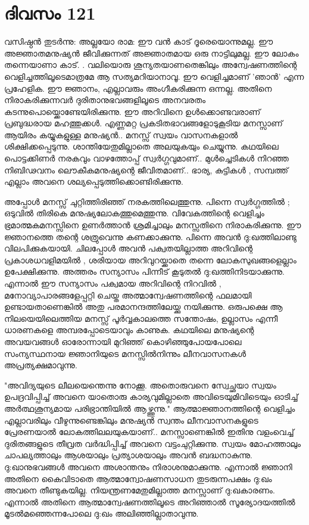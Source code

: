 \newpage
\section{ദിവസം 121}


വസിഷ്ഠന്‍ തുടര്‍ന്നു: അല്ലയോ രാമ: ഈ വന്‍ കാട്‌ ദൂരെയൊന്നുമല്ല. ഈ അജ്ഞാതമനുഷ്യന്‍ ജീവിക്കുന്നത്‌ അജ്ഞാതമായ ഒരു നാട്ടിലുമല്ല. ഈ ലോകം തന്നെയാണാ കാട്‌. . വലിയൊരു ശൂന്യതയാണതെങ്കിലും അന്വേഷണത്തിന്റെ വെളിച്ചത്തിലൂടെമാത്രമേ ആ സത്യമറിയാനാവൂ. ഈ വെളിച്ചമാണ്‌ 'ഞാന്‍' എന്ന പ്രഹേളിക. ഈ ജ്ഞാനം, എല്ലാവരും അംഗീകരിക്കുന്ന ഒന്നല്ല. അതിനെ നിരാകരിക്കുന്നവര്‍ ദുരിതാനുഭവങ്ങളിലൂടെ അനവരതം കടന്നുപൊയ്ക്കൊണ്ടേയിരിക്കുന്നു. ഈ അറിവിനെ ഉള്‍ക്കൊണ്ടവരാണ്‌ പ്രബുദ്ധരായ മഹത്തുക്കള്‍.   എണ്ണമറ്റ പ്രകടിതഭാവങ്ങളോടുകൂടിയ മനസ്സാണ്‌ ആയിരം കയ്യുകളുള്ള മനുഷ്യന്‍.. മനസ്സ്‌ സ്വയം വാസനകളാല്‍ ശിക്ഷിക്കപ്പെടുന്നു. ശാന്തിയേതുമില്ലാതെ അലയുകയും ചെയ്യുന്നു. കഥയിലെ പൊട്ടക്കിണര്‍ നരകവും വാഴത്തോപ്പ്‌ സ്വര്‍ഗ്ഗവുമാണ്‌.. മുള്‍ച്ചെടികള്‍ നിറഞ്ഞ നിബിഢവനം ലൌകീകമനുഷ്യന്റെ ജീവിതമാണ്‌.. ഭാര്യ, കുട്ടികള്‍ , സമ്പത്ത്‌ എല്ലാം അവനെ ശല്യപ്പെടുത്തിക്കൊണ്ടിരിക്കുന്നു.

അപ്പോള്‍ മനസ്സ്‌ ചുറ്റിത്തിരിഞ്ഞ്‌ നരകത്തിലെത്തുന്നു. പിന്നെ സ്വര്‍ഗ്ഗത്തില്‍ ; ഒടുവില്‍ തിരികെ മനുഷ്യലോകത്തുമെത്തുന്നു. വിവേകത്തിന്റെ വെളിച്ചം ഭ്രമാത്മകമനസ്സിനെ ഉണര്‍ത്താന്‍ ശ്രമിച്ചാലും മനസ്സതിനെ നിരാകരിക്കുന്നു. ഈ ജ്ഞാനത്തെ തന്റെ ശത്രുവെന്നു കണക്കാക്കുന്നു. പിന്നെ അവന്‍ ദു:ഖത്തിലാണ്ടു വിലപിക്കുകയായി. ചിലപ്പോള്‍ അവന്‍ പക്വതയില്ലാത്ത അറിവിന്റെ പ്രകാശധവളിമയില്‍ , ശരിയായ അറിവുറയ്ക്കാതെ തന്നെ ലോകസുഖങ്ങളെല്ലാം ഉപേക്ഷിക്കുന്നു. അത്തരം സന്യാസം പിന്നീട്‌ കൂടുതല്‍ ദു:ഖത്തിനിടയാക്കുന്നു. എന്നാല്‍ ഈ സന്യാസം പക്വമായ അറിവിന്റെ നിറവില്‍ , മനോവ്യാപാരങ്ങളേപ്പറ്റി ചെയ്ത അത്മാന്വേഷണത്തിന്റെ ഫലമായി ഉണ്ടായതാണെങ്കില്‍ അതു പരമാനന്ദത്തിലേയ്ക്കു നയിക്കുന്നു. ഒരുപക്ഷെ ആ നിലയെയിലെത്തിയ മനസ്സ്‌ പൂര്‍വ്വകാലത്തെ സന്തോഷം, ഉല്ലാസം എന്നീ ധാരണകളെ അമ്പരപ്പോടെയാവും കാണുക. കഥയിലെ മനുഷ്യന്റെ അവയവങ്ങള്‍ ഓരോന്നായി മുറിഞ്ഞ്‌ കൊഴിഞ്ഞുപോയപോലെ സംന്യസ്ഥനായ ജ്ഞാനിയുടെ മനസ്സില്‍നിന്നും ലീനവാസനകള്‍ അപ്രത്യക്ഷമാവുന്നു.

"അവിദ്യയുടെ ലീലയെന്തെന്നു നോക്കൂ. അതൊരുവനെ സ്വേച്ഛയാ സ്വയം ഉപദ്രവിപ്പിച്ച്‌ അവനെ യാതൊരു കാര്യവുമില്ലാതെ അവിടെയുമിവിടെയും ഓടിച്ച്‌ അര്‍ത്ഥശൂന്യമായ പരിഭ്രാന്തിയില്‍ ആഴ്ത്തുന്നു." ആത്മാജ്ഞാനത്തിന്റെ വെളിച്ചം എല്ലാവരിലും വീഴുന്നുണ്ടെങ്കിലും മനുഷ്യന്‍ സ്വന്തം ലീനവാസനകളുടെ പ്രേരണയാല്‍ ലോകത്തിലലയുകയാണ്‌.. മനസ്സാണെങ്കില്‍ ഇതിനു വളംവെച്ച്‌ ദുരിതങ്ങളുടെ തീവ്രത വര്‍ദ്ധിപ്പിച്ച്‌ അവനെ വട്ടംചുറ്റിക്കുന്നു. സ്വയം മോഹത്താലും ചാപല്യത്താലും ആശയാലും പ്രത്യാശയാലും അവന്‍ ബദ്ധനാകുന്നു. ദു:ഖാനുഭവങ്ങള്‍ അവനെ അശാന്തനും നിരാശനുമാക്കുന്നു. എന്നാല്‍ ജ്ഞാനി അതിനെ കൈവിടാതെ ആത്മാന്വോഷണസാധന തുടരുന്നപക്ഷം ദു:ഖം അവനെ തീണ്ടുകയില്ല. നിയന്ത്രണമേതുമില്ലാത്ത മനസ്സാണ്‌ ദു:ഖകാരണം. എന്നാല്‍ അതിനെ ആത്മാന്വേഷണത്തിലൂടെ അറിഞ്ഞാല്‍ സൂര്യോദയത്തില്‍ മൂടല്‍മഞ്ഞെന്നപോലെ ദു:ഖം അലിഞ്ഞില്ലാതാവുന്നു.

